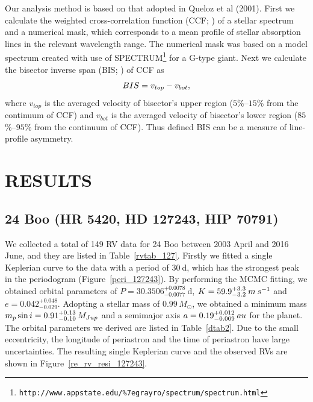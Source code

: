 \documentclass[]{pasj01}
\begin{document}
Our analysis method is based on that adopted in Queloz et al (2001). 
First we calculate the weighted cross-correlation function (CCF; \cite{Pepe2002}) of a stellar spectrum and a numerical mask, which corresponds to a mean profile of stellar absorption lines in the relevant wavelength range. 
The numerical mask was based on a model spectrum created with use of SPECTRUM\footnote{\tt{http://www.appstate.edu/\%7egrayro/spectrum/spectrum.html}} \citep{Gray1994} for a G-type giant. 
Next we calculate the bisector inverse span (BIS; \cite{Dall2006}) of CCF as
\begin{equation}
{\rm BIS} = v_{top} - v_{bot},
\end{equation}
where $v_{top}$ is the averaged velocity of bisector's upper region ($5$\%--$15$\% from the continuum of CCF) and $v_{bot}$ is the averaged velocity of bisector's lower region ($85$\%--$95$\% from the continuum of CCF).
Thus defined BIS can be a measure of line-profile asymmetry.
\section{RESULTS}
\subsection{24 Boo (HR 5420, HD 127243, HIP 70791)}
We collected a total of 149 RV data for 24 Boo between 2003 April and 2016 June, and they are listed in Table~\ref{rvtab_127}.
Firstly we fitted a single Keplerian curve to the data with a period of $30\>$d, which has the strongest peak in the periodogram (Figure~\ref{peri_127243}).
By performing the MCMC fitting, we obtained orbital parameters of $P= 30.3506_{-0.0077}^{+0.0078}\>$d, $K=59.9_{-3.2}^{+3.3}\>{\rm m\>s^{-1}}$ and $e=0.042_{-0.029}^{+0.048} $.
Adopting a stellar mass of $0.99\,M_{\odot}$, we obtained a minimum mass $m_p\sin{i}=0.91_{-0.10}^{+0.13}\,M_{\rm Jup}$ and a semimajor axis $a=0.19_{-0.009}^{+0.012}\>{\rm au}$ for the planet.
The orbital parameters we derived are listed in Table~\ref{dtab2}.
Due to the small eccentricity, the longitude of periastron and the time of periastron have large uncertainties.
The resulting single Keplerian curve and the observed RVs are shown in Figure~\ref{re_rv_resi_127243}.
\end{document}
